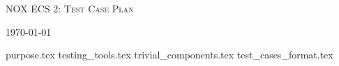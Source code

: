 \documentclass[hidelinks]{article}
\begin{document}
\begin{titlepage}
    \centering
    {\scshape\LARGE NOX ECS 2: Test Case Plan \par}
    \vfill
    {\large \today\par}
\end{titlepage}

\tableofcontents
\pagebreak


{purpose.tex}
{testing_tools.tex}
{trivial_components.tex}
{test_cases_format.tex}
\end{document}

